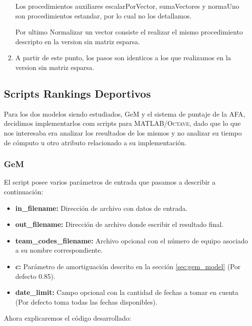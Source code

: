 \begin{enumerate}
	Los procedimientos auxiliares escalarPorVector, sumaVectores y normaUno son procedimientos estandar, por lo cual no los detallamos.

	Por ultimo Normalizar un vector consiste el realizar el mismo procedimiento descripto en la version sin matriz esparsa.
	\item A partir de este punto, los pasos son identicos a los que realizamos en la version sin matriz esparsa.

\end{enumerate}

\subsection{Scripts Rankings Deportivos}

Para los dos modelos siendo estudiados, GeM y el sistema de puntaje de la AFA,
decidimos implementarlos com scripts para \textsc{MATLAB/Octave}, dado que lo que nos
interesaba era analizar los resultados de los mismos y no analizar su tiempo de
cómputo u otro atributo relacionado a su implementación.

\subsubsection{GeM}

El script posee varios parámetros de entrada que pasamos a describir a
continuación:

\begin{itemize}
	\item \textbf{in_filename:} Dirección de archivo con datos de entrada.
	\item \textbf{out_filename:} Dirección de archivo donde escribir el
	resultado final.
	\item \textbf{team_codes_filename:} Archivo opcional con el número de equipo
	asociado a su nombre correspondiente.
	\item \textbf{c:} Parámetro de amortiguación descrito en la
	sección \ref{sec:gem_model} (Por defecto 0.85).
	\item \textbf{date_limit:} Campo opcional con la cantidad de fechas a tomar
	en cuenta (Por defecto toma todas las fechas disponibles).
\end{itemize}

Ahora explicaremos el código desarrollado:

